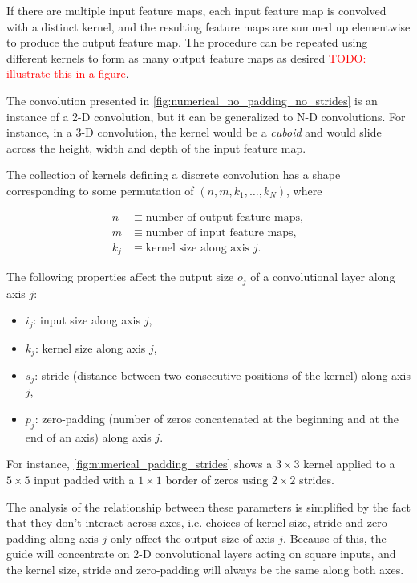 \documentclass{report}
\newcommand{\todo}[1]{\textcolor{red}{TODO: #1}}
\begin{document}
If there are multiple input feature maps, each input feature map is convolved
with a distinct kernel, and the resulting feature maps are summed up elementwise
to produce the output feature map. The procedure can be repeated using different
kernels to form as many output feature maps as desired \todo{illustrate this in
a figure}.

The convolution presented in \autoref{fig:numerical_no_padding_no_strides} is an
instance of a 2-D convolution, but it can be generalized to N-D convolutions.
For instance, in a 3-D convolution, the kernel would be a {\em cuboid} and would
slide across the height, width and depth of the input feature map.

The collection of kernels defining a discrete convolution has a shape
corresponding to some permutation of $(n, m, k_1, \ldots, k_N)$, where

\begin{equation}
\begin{split}
    n &\equiv \text{number of output feature maps},\\
    m &\equiv \text{number of input feature maps},\\
    k_j &\equiv \text{kernel size along axis $j$}.
\end{split}
\end{equation}

The following properties affect the output size $o_j$ of a convolutional layer
along axis $j$:

\begin{itemize}
    \item $i_j$: input size along axis $j$,
    \item $k_j$: kernel size along axis $j$,
    \item $s_j$: stride (distance between two consecutive positions of the
        kernel) along axis $j$,
    \item $p_j$: zero-padding (number of zeros concatenated at the beginning and
        at the end of an axis) along axis $j$.
\end{itemize}

For instance, \autoref{fig:numerical_padding_strides} shows a $3 \times 3$
kernel applied to a $5 \times 5$ input padded with a $1 \times 1$ border of
zeros using $2 \times 2$ strides.

The analysis of the relationship between these parameters is simplified by the
fact that they don't interact across axes, i.e. choices of kernel size, stride
and zero padding along axis $j$ only affect the output size of axis $j$.
Because of this, the guide will concentrate on 2-D convolutional layers acting
on square inputs, and the kernel size, stride and zero-padding will always be
the same along both axes.
\end{document}

